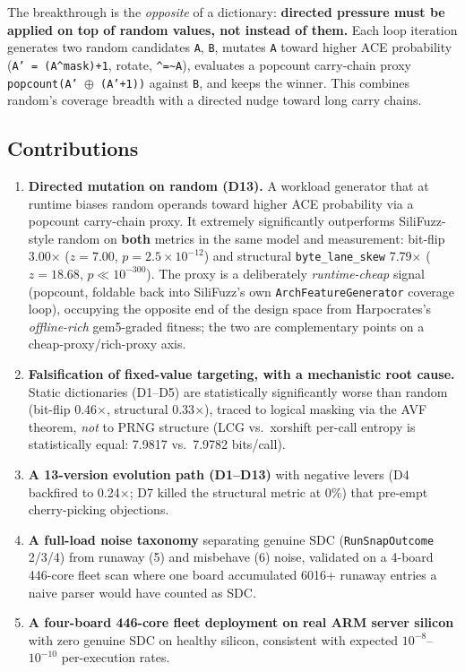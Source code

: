 \documentclass[sigplan,review,anonymous]{acmart}
\begin{document}
The breakthrough is the \emph{opposite} of a dictionary: \textbf{directed pressure must be applied on top of random values, not instead of them.} Each loop iteration generates two random candidates \texttt{A}, \texttt{B}, mutates \texttt{A} toward higher ACE probability (\texttt{A' = (A\^{}mask)+1}, rotate, \texttt{\^{}=\textasciitilde{}A}), evaluates a popcount carry-chain proxy \texttt{popcount(A' $\oplus$ (A'+1))} against \texttt{B}, and keeps the winner. This combines random's coverage breadth with a directed nudge toward long carry chains.

\subsection{Contributions}
\begin{enumerate}
\item \textbf{Directed mutation on random (D13).} A workload generator that at runtime biases random operands toward higher ACE probability via a popcount carry-chain proxy. It extremely significantly outperforms SiliFuzz-style random on \textbf{both} metrics in the same model and measurement: bit-flip 3.00$\times$ ($z{=}7.00$, $p{=}2.5\times10^{-12}$) and structural \texttt{byte\_lane\_skew} 7.79$\times$ ($z{=}18.68$, $p{\ll}10^{-300}$). The proxy is a deliberately \emph{runtime-cheap} signal (popcount, foldable back into SiliFuzz's own \texttt{ArchFeatureGenerator} coverage loop), occupying the opposite end of the design space from Harpocrates's \emph{offline-rich} gem5-graded fitness; the two are complementary points on a cheap-proxy/rich-proxy axis.
\item \textbf{Falsification of fixed-value targeting, with a mechanistic root cause.} Static dictionaries (D1--D5) are statistically significantly worse than random (bit-flip 0.46$\times$, structural 0.33$\times$), traced to logical masking via the AVF theorem, \emph{not} to PRNG structure (LCG vs.\ xorshift per-call entropy is statistically equal: 7.9817 vs.\ 7.9782 bits/call).
\item \textbf{A 13-version evolution path (D1--D13)} with negative levers (D4 backfired to 0.24$\times$; D7 killed the structural metric at 0\%) that pre-empt cherry-picking objections.
\item \textbf{A full-load noise taxonomy} separating genuine SDC (\texttt{RunSnapOutcome} 2/3/4) from runaway (5) and misbehave (6) noise, validated on a 4-board 446-core fleet scan where one board accumulated 6016+ runaway entries a naive parser would have counted as SDC.
\item \textbf{A four-board 446-core fleet deployment on real ARM server silicon} with zero genuine SDC on healthy silicon, consistent with expected $10^{-8}$--$10^{-10}$ per-execution rates.
\end{enumerate}
\end{document}
